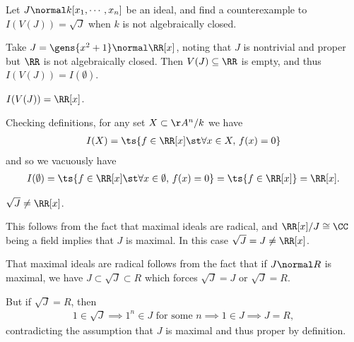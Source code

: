 \newpage

\begin{exercise}[Extra]

Let \(J \normal k[x_1, \cdots, x_n]\) be an ideal, and find a
counterexample to \(I(V(J)) =\sqrt{J}\) when \(k\) is not algebraically
closed.

\end{exercise}

\begin{solution}

Take \(J = \gens{x^2+1} \normal \RR[x]\), noting that \(J\) is
nontrivial and proper but \(\RR\) is not algebraically closed. Then
\(V(J) \subseteq \RR\) is empty, and thus \(I(V(J)) = I(\emptyset)\).

\begin{claim}

\(I(V(J)) = \RR[x]\).

Checking definitions, for any set \(X \subset \AA^n/k\) we have
\begin{align*}  
I(X) = \ts{f\in \RR[x] \st \forall x\in X,\, f(x)=0} \\
\end{align*} and so we vacuously have
\begin{align*}
I(\emptyset) = \ts{f\in \RR[x] \st \forall x\in \emptyset,\, f(x)=0}
= \ts{f\in \RR[x]} = \RR[x]
.\end{align*}

\end{claim}

\begin{claim}

\(\sqrt{J} \neq \RR[x]\).

This follows from the fact that maximal ideals are radical, and
\(\RR[x]/ J \cong \CC\) being a field implies that \(J\) is maximal. In
this case \(\sqrt{J} = J \neq \RR[x]\).

\hfill\break
That maximal ideals are radical follows from the fact that if
\(J\normal R\) is maximal, we have \(J \subset \sqrt{J} \subset R\)
which forces \(\sqrt{J} = J\) or \(\sqrt{J}=R\).

\hfill\break
But if \(\sqrt{J}=R\), then
\begin{align*}  
1\in \sqrt{J} \implies 1^n \in J \text{ for some }n \implies 1 \in J \implies J=R
,\end{align*} contradicting the assumption that \(J\) is maximal and
thus proper by definition.

\end{claim}

\end{solution}

